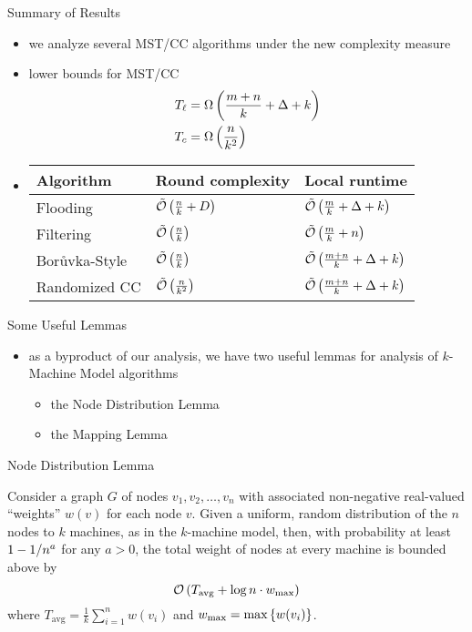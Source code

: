 \begin{frame}{Summary of Results}
    \begin{itemize}
        \item we analyze several MST/CC algorithms under the new complexity measure
        \item lower bounds for MST/CC
              \begin{align*}
                  T_{\ell} & = \Omega\left(\frac{m + n}{k} + \Delta + k\right) \\
                  T_c & = \Omega\left(\frac{n}{k^2}\right)
              \end{align*}
        \item
              \begin{tabular}{@{}lll@{}}\toprule
                  Algorithm                  & Round complexity          & Local runtime                        \\\midrule
                  Flooding                   & $\tilde{\mathcal{O}}\left(\frac{n}{k} + D\right)$ & $\tilde{\mathcal{O}}\left(\frac{m}{k} + \Delta + k\right)$   \\
                  Filtering                  & $\tilde{\mathcal{O}}\left(\frac{n}{k}\right)$     & $\tilde{\mathcal{O}}\left(\frac{m}{k} + n\right)$            \\
                  Bor\r{u}vka-Style & $\tilde{\mathcal{O}}\left(\frac{n}{k}\right)$     & $\tilde{\mathcal{O}}\left(\frac{m+n}{k} + \Delta + k\right)$ \\
                  Randomized CC              & $\tilde{\mathcal{O}}\left(\frac{n}{k^2}\right)$   & $\tilde{\mathcal{O}}\left(\frac{m+n}{k} + \Delta + k\right)$
              \end{tabular}
    \end{itemize}
\end{frame}

\begin{frame}{Some Useful Lemmas}
    \begin{itemize}
        \item as a byproduct of our analysis, we have two useful lemmas for analysis of $k$-Machine Model algorithms
              \begin{itemize}
                  \item the Node Distribution Lemma
                  \item the Mapping Lemma
              \end{itemize}
    \end{itemize}
\end{frame}

\begin{frame}{Node Distribution Lemma}
    \begin{lemma}
        Consider a graph $G$ of nodes $v_1, v_2, \hdots, v_n$ with associated
        non-negative real-valued ``weights'' $w(v)$ for each node $v$. Given a
        uniform, random distribution of the $n$ nodes to $k$ machines, as in the
        $k$-machine model, then, with probability at least $1 - 1 / n^a$ for any
        $a > 0$, the total weight of nodes at every machine is bounded above by
        \[\mathcal{O}\left(T_{\text{avg}}+\log{n}\cdot w_{\text{max}}\right)\]
        where $T_{\text{avg}}=\frac{1}{k}\sum_{i=1}^n w(v_i)$ and
        $w_{\text{max}} = \text{max}\left\{w(v_i)\right\}$.
    \end{lemma}
\end{frame}

